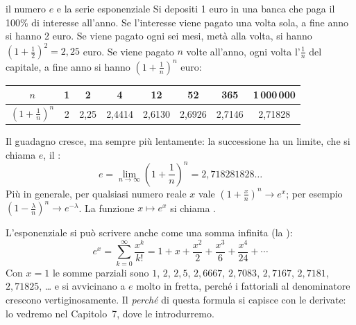 \begin{richiamo}{il numero $e$ e la serie esponenziale}
Si depositi 1 euro in una banca che paga il 100\% di interesse all'anno. Se l'interesse viene pagato una volta sola,
a fine anno si hanno 2 euro. Se viene pagato ogni sei mesi, metà alla volta, si hanno
$(1 + \frac12)^2 = 2{,}25$ euro. Se viene pagato $n$ volte all'anno, ogni volta l'$\frac1n$ del capitale, a fine anno
si hanno $\left(1 + \frac1n\right)^n$ euro:
\begin{center}
\renewcommand{\arraystretch}{1.2}
\begin{tabular}{@{}c|ccccccc@{}}
  $n$ & 1 & 2 & 4 & 12 & 52 & 365 & 1\,000\,000 \\ \hline
  $\left(1 + \frac1n\right)^n$ & 2 & 2,25 & 2,4414 & 2,6130 & 2,6926 & 2,7146 & 2,71828
\end{tabular}
\end{center}
Il guadagno cresce, ma sempre più lentamente: la successione ha un limite, che si chiama $e$, il :
\[ e = \lim_{n \to \infty} \left( 1 + \frac{1}{n} \right)^n = 2{,}718281828\ldots \]
Più in generale, per qualsiasi numero reale $x$ vale $\left(1 + \frac{x}{n}\right)^n \to e^x$; per esempio
$\left(1 - \frac{\lambda}{n}\right)^n \to e^{-\lambda}$. La funzione $x \mapsto e^x$ si chiama .

L'esponenziale si può scrivere anche come una somma infinita (la ):
\[ e^x = \sum_{k=0}^{\infty} \frac{x^k}{k!} = 1 + x + \frac{x^2}{2} + \frac{x^3}{6} + \frac{x^4}{24} + \cdots \]
Con $x = 1$ le somme parziali sono $1$, $2$, $2{,}5$, $2{,}6667$, $2{,}7083$, $2{,}7167$, $2{,}7181$, $2{,}71825$,
\ldots{} e si avvicinano a $e$ molto in fretta, perché i fattoriali al denominatore crescono vertiginosamente. Il
\emph{perché} di questa formula si capisce con le derivate: lo vedremo nel Capitolo~7, dove le introdurremo.
\end{richiamo}


